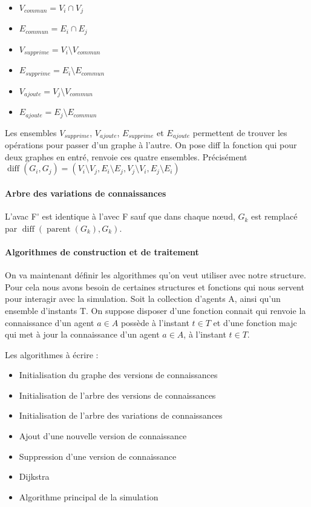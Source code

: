 \documentclass[a4paper]{article}
\DeclareMathOperator{\diff}{diff}
\DeclareMathOperator{\parent}{parent}
\begin{document}
\begin{itemize}
  \item $V_{commun} = V_i \cap V_j$
  \item $E_{commun} = E_i \cap E_j$
  \item $V_{supprime} = V_i \setminus V_{commun}$
  \item $E_{supprime} = E_i \setminus E_{commun}$
  \item $V_{ajoute} = V_j \setminus V_{commun}$
  \item $E_{ajoute} = E_j \setminus E_{commun}$
\end{itemize}

Les ensembles $V_{supprime}$, $V_{ajoute}$, $E_{supprime}$ et $E_{ajoute}$
permettent de trouver les opérations pour passer d'un graphe à l'autre. On pose
\gls{diff} la fonction qui pour deux graphes en entré, renvoie ces quatre
ensembles. Précisément $\diff(G_i,G_j) = (V_i \setminus V_j, E_i \setminus E_j,
V_j \setminus V_i, E_j \setminus E_i)$

\paragraph{Arbre des variations de connaissances} L'\gls{avac} \gls{F'} est
identique à l'\gls{avec} \gls{F} sauf que dans chaque nœud, $G_k$ est remplacé
par $\diff(\parent(G_k),G_k)$.

\paragraph{Algorithmes de construction et de traitement} On va maintenant
définir les algorithmes qu'on veut utiliser avec notre structure. Pour cela nous
avons besoin de certaines structures et fonctions qui nous servent pour
interagir avec la simulation. Soit la collection d'agents \gls{A}, ainsi qu'un
ensemble d'instants \gls{T}. On suppose disposer d'une fonction \gls{connait}
qui renvoie la connaissance d'un agent $a\in A$ possède à l'instant $t\in T$ et
d'une fonction \gls{majc} qui met à jour la connaissance d'un agent $a \in A$, à
l'instant $t\in T$.

Les algorithmes à écrire :

\begin{itemize}
  \item Initialisation du graphe des versions de connaissances
  \item Initialisation de l'arbre des versions de connaissances
  \item Initialisation de l'arbre des variations de connaissances
  \item Ajout d'une nouvelle version de connaissance
  \item Suppression d'une version de connaissance 
  \item Dijkstra
  \item Algorithme principal de la simulation
\end{itemize}
\end{document}

